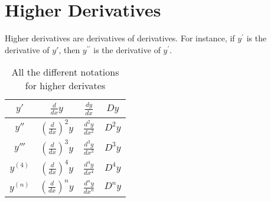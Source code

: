 \documentclass[../main.tex]{subfiles}
\begin{document}
\chapter{Higher Derivatives}
Higher derivatives are derivatives of derivatives. 
For instance, if $y^\prime$ is the derivative of $y'$, 
then $y^{\prime\prime}$ is the derivative of $y^\prime$.
\begin{table}[h]
    \centering
    \caption{All the different notations for higher derivates}
    \label{tab:notations}
    \begin{tabular}{c|c|c|c}
    $y'$      & $\frac{d}{dx}y$                   & $\frac{dy}{dx}$     & $Dy$   \\ \hline
    $y''$     & $\left( \frac{d}{dx} \right)^2 y$ & $\frac{d^2y}{dx^2}$ & $D^2y$ \\ \hline
    $y'''$    & $\left( \frac{d}{dx} \right)^3 y$ & $\frac{d^3y}{dx^3}$ & $D^3y$ \\ \hline
    $y^{(4)}$ & $\left( \frac{d}{dx} \right)^4 y$ & $\frac{d^4y}{dx^4}$ & $D^4y$ \\ \hline
    $y^{(n)}$ & $\left( \frac{d}{dx} \right)^n y$ & $\frac{d^ny}{dx^n}$ & $D^ny$
    \end{tabular}
\end{table}
\end{document}
